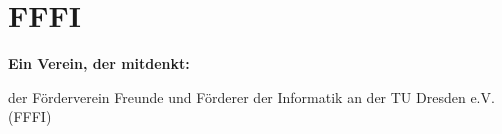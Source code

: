 \section{FFFI}

\textbf{Ein Verein, der mitdenkt:}

der Förderverein Freunde und Förderer der Informatik an der TU Dresden e.V. (FFFI)